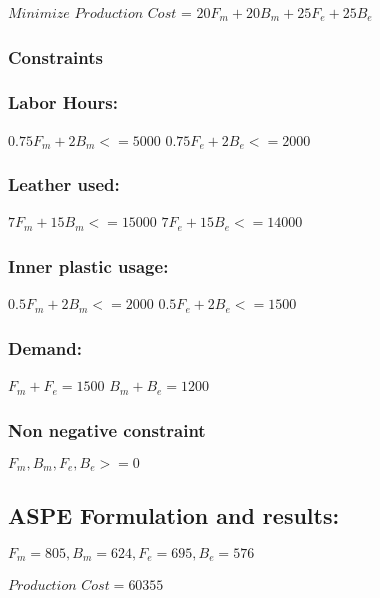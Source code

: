 \documentclass[]{article}
\begin{document}
\(Minimize\) \(Production\) \(Cost\) =
\(20F_{m} + 20B_{m} + 25F_{e} + 25B_{e}\)

\subsubsection{Constraints}\label{constraints-1}

\subsubsection{Labor Hours:}\label{labor-hours}

\(0.75F_{m} + 2B_{m} <= 5000\) \(0.75F_{e} + 2B_{e} <= 2000\)

\subsubsection{Leather used:}\label{leather-used}

\(7F_{m} + 15B_{m} <= 15000\) \(7F_{e} + 15B_{e} <= 14000\)

\subsubsection{Inner plastic usage:}\label{inner-plastic-usage}

\(0.5F_{m} + 2B_{m} <= 2000\) \(0.5F_{e} + 2B_{e} <= 1500\)

\subsubsection{Demand:}\label{demand}

\(F_{m} + F_{e} = 1500\) \(B_{m} + B_{e} = 1200\)

\subsubsection{Non negative constraint}\label{non-negative-constraint}

\(F_{m},B_{m},F_{e},B_{e} >= 0\)

\subsection{ASPE Formulation and
results:}\label{aspe-formulation-and-results-1}

\(F_{m} = 805,B_{m} = 624,F_{e} = 695,B_{e}= 576\)

\(Production\) \(Cost = 60355\)

\newpage
\end{document}
